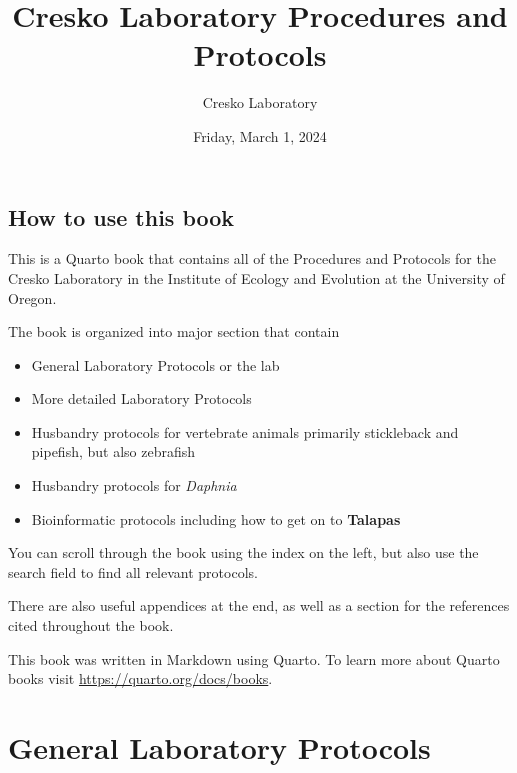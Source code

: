 \documentclass[
  letterpaper,
  DIV=11,
  numbers=noendperiod]{scrreprt}
\title{Cresko Laboratory Procedures and Protocols}
\author{Cresko Laboratory}
\date{Friday, March 1, 2024}
\renewcommand*\contentsname{Table of contents}
\newcommand\contentsname{Table of contents}
\begin{document}
\maketitle
\ifdefined\Shaded\renewenvironment{Shaded}{\begin{tcolorbox}[enhanced, boxrule=0pt, sharp corners, frame hidden, interior hidden, borderline west={3pt}{0pt}{shadecolor}, breakable]}{\end{tcolorbox}}\fi

\renewcommand*\contentsname{Table of contents}
{
\hypersetup{linkcolor=}
\setcounter{tocdepth}{2}
\tableofcontents
}

\hypertarget{how-to-use-this-book}{%
\chapter*{How to use this book}\label{how-to-use-this-book}}


This is a Quarto book that contains all of the Procedures and Protocols
for the Cresko Laboratory in the Institute of Ecology and Evolution at
the University of Oregon.

The book is organized into major section that contain

\begin{itemize}
\item
  General Laboratory Protocols or the lab
\item
  More detailed Laboratory Protocols
\item
  Husbandry protocols for vertebrate animals primarily stickleback and
  pipefish, but also zebrafish
\item
  Husbandry protocols for \emph{Daphnia}
\item
  Bioinformatic protocols including how to get on to \textbf{Talapas}
\end{itemize}

You can scroll through the book using the index on the left, but also
use the search field to find all relevant protocols.

There are also useful appendices at the end, as well as a section for
the references cited throughout the book.

This book was written in Markdown using Quarto. To learn more about
Quarto books visit \url{https://quarto.org/docs/books}.

\part{General Laboratory Protocols}
\end{document}
